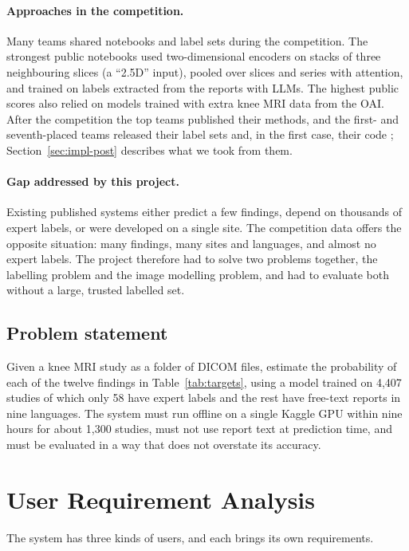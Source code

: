 \paragraph{Approaches in the competition.} Many teams shared notebooks and label sets during the competition. The strongest public notebooks used two-dimensional encoders on stacks of three neighbouring slices (a ``2.5D'' input), pooled over slices and series with attention, and trained on labels extracted from the reports with LLMs. The highest public scores also relied on models trained with extra knee MRI data from the OAI. After the competition the top teams published their methods, and the first- and seventh-placed teams released their label sets and, in the first case, their code \cite{tascj_boxpool,songqizhou_llmlabels}; Section~\ref{sec:impl-post} describes what we took from them.

\paragraph{Gap addressed by this project.} Existing published systems either predict a few findings, depend on thousands of expert labels, or were developed on a single site. The competition data offers the opposite situation: many findings, many sites and languages, and almost no expert labels. The project therefore had to solve two problems together, the labelling problem and the image modelling problem, and had to evaluate both without a large, trusted labelled set.

\subsection{Problem statement}

Given a knee MRI study as a folder of DICOM files, estimate the probability of each of the twelve findings in Table~\ref{tab:targets}, using a model trained on 4,407 studies of which only 58 have expert labels and the rest have free-text reports in nine languages. The system must run offline on a single Kaggle GPU within nine hours for about 1,300 studies, must not use report text at prediction time, and must be evaluated in a way that does not overstate its accuracy.

\section{User Requirement Analysis}

The system has three kinds of users, and each brings its own requirements.

